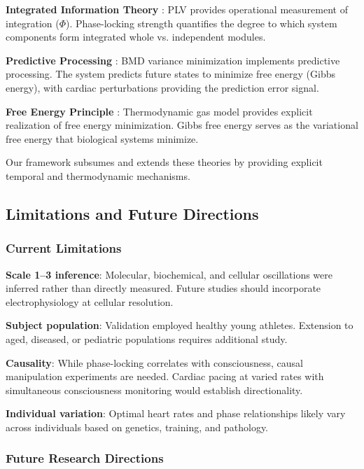 \documentclass[12pt]{article}
\theoremstyle{remark}
\begin{document}
\textbf{Integrated Information Theory} \citep{tononi2004information}: PLV provides operational measurement of integration ($\Phi$). Phase-locking strength quantifies the degree to which system components form integrated whole vs. independent modules.

\textbf{Predictive Processing} \citep{friston2010free}: BMD variance minimization implements predictive processing. The system predicts future states to minimize free energy (Gibbs energy), with cardiac perturbations providing the prediction error signal.

\textbf{Free Energy Principle} \citep{friston2006free}: Thermodynamic gas model provides explicit realization of free energy minimization. Gibbs free energy serves as the variational free energy that biological systems minimize.

Our framework subsumes and extends these theories by providing explicit temporal and thermodynamic mechanisms.

\subsection{Limitations and Future Directions}

\subsubsection{Current Limitations}

\textbf{Scale 1--3 inference}: Molecular, biochemical, and cellular oscillations were inferred rather than directly measured. Future studies should incorporate electrophysiology at cellular resolution.

\textbf{Subject population}: Validation employed healthy young athletes. Extension to aged, diseased, or pediatric populations requires additional study.

\textbf{Causality}: While phase-locking correlates with consciousness, causal manipulation experiments are needed. Cardiac pacing at varied rates with simultaneous consciousness monitoring would establish directionality.

\textbf{Individual variation}: Optimal heart rates and phase relationships likely vary across individuals based on genetics, training, and pathology.

\subsubsection{Future Research Directions}
\end{document}
